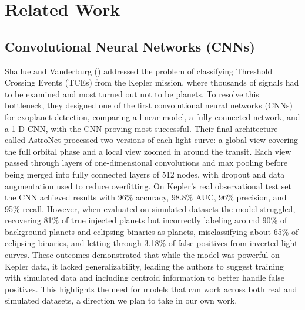 \documentclass[letterpaper]{article} %
\begin{document}
\section*{Related Work}
\subsection{Convolutional Neural Networks (CNNs)}
Shallue and Vanderburg (\citeyear{Shallue2018identifyexoplanetsI}) addressed the problem of classifying Threshold Crossing Events (TCEs) from the Kepler mission, where thousands of signals had to be examined and most turned out not to be planets. To resolve this bottleneck, they designed one of the first convolutional neural networks (CNNs) for exoplanet detection, comparing a linear model, a fully connected network, and a 1-D CNN, with the CNN proving most successful. Their final architecture called AstroNet processed two versions of each light curve: a global view covering the full orbital phase and a local view zoomed in around the transit. Each view passed through layers of one-dimensional convolutions and max pooling before being merged into fully connected layers of 512 nodes, with dropout and data augmentation used to reduce overfitting. On Kepler’s real observational test set the CNN achieved results with 96\% accuracy, 98.8\% AUC, 96\% precision, and 95\% recall. However, when evaluated on simulated datasets the model struggled, recovering 81\% of true injected planets but incorrectly labeling around 90\% of background planets and eclipsing binaries as planets, misclassifying about 65\% of eclipsing binaries, and letting through 3.18\% of false positives from inverted light curves. These outcomes demonstrated that while the model was powerful on Kepler data, it lacked generalizability, leading the authors to suggest training with simulated data and including centroid information to better handle false positives. This highlights the need for models that can work across both real and simulated datasets, a direction we plan to take in our own work.
\end{document}
